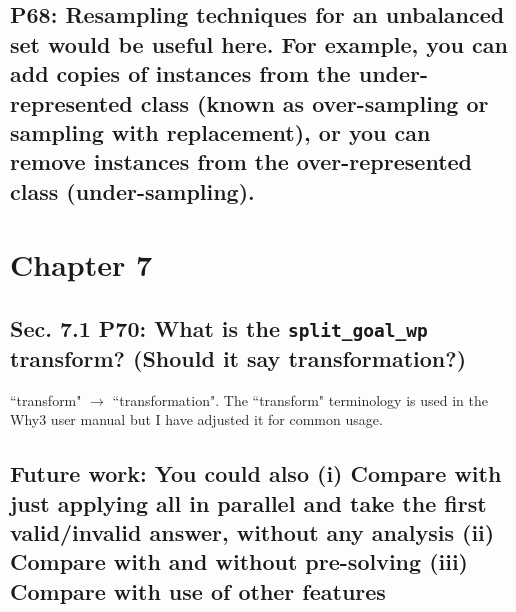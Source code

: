 \documentclass[]{article}
\begin{document}
\subsection{P68: Resampling techniques for an unbalanced set would be useful here. For example, you can add copies of instances from the under-represented class (known as over-sampling or sampling with replacement), or you can remove instances from the over-represented class (under-sampling).}

\section{Chapter 7}

\subsection{Sec. 7.1 P70: What is the \texttt{split\_goal\_wp} transform? (Should it say transformation?)}

``transform" $\rightarrow$ ``transformation". The ``transform" terminology is used in the \textsf{Why3} user manual but I have adjusted it for common usage. 

\subsection{Future work: You could also (i) Compare with just applying all in parallel and take the first valid/invalid answer,	without any analysis (ii) Compare with and without pre-solving (iii) Compare with use of other features}
\end{document}
